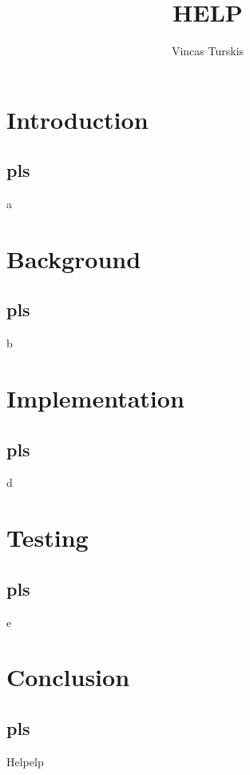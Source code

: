 \documentclass[11pt,a4paper]{report}
\author{Vincas Turskis}
\title{HELP}
\begin{document}
\tableofcontents
\chapter{Introduction}
\section{pls}
a

\chapter{Background}
\section{pls}
b



\chapter{Implementation}
\section{pls}
d

\chapter{Testing}
\section{pls}
e

\chapter{Conclusion}
\section{pls}
Helpelp
\end{document}
